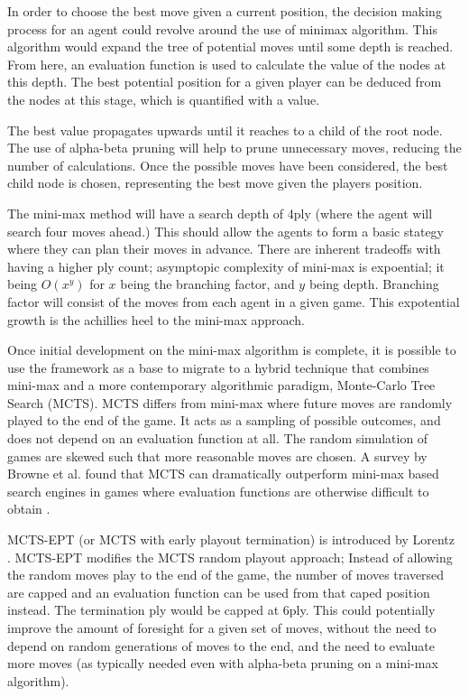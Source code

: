 \documentclass[12pt,a4paper]{article}
\begin{document}
    In order to choose the best move given a current position, the decision making process for an agent could revolve around the use of minimax algorithm. This algorithm would expand the tree of potential moves until some depth is reached. From here, an evaluation function is used to calculate the value of the nodes at this depth. The best potential position for a given player can be deduced from the nodes at this stage, which is quantified with a value.

    The best value propagates upwards until it reaches to a child of the root node. The use of alpha-beta pruning will help to prune unnecessary moves,  reducing the number of calculations. Once the possible moves have been considered, the best child node is chosen, representing the best move given  the players position.

    The mini-max method will have a search depth of 4ply (where the agent will search four moves ahead.) This should allow the agents to form a basic stategy where they can plan their moves in advance. There are inherent tradeoffs with having a higher ply count; asymptopic complexity of mini-max is expoential; it being $O(x^y)$ for $x$ being the branching factor, and $y$ being depth. Branching factor will consist of the moves from each agent in a given game. This expotential growth is the achillies heel to the mini-max approach.

    Once initial development on the mini-max algorithm is complete, it is possible to use the framework as a base to migrate to a hybrid technique that combines mini-max and a more contemporary algorithmic paradigm, Monte-Carlo Tree Search (MCTS). MCTS differs from mini-max where future moves are randomly played to the end of the game. It acts as a sampling of possible outcomes, and does not depend on an evaluation function at all. The random simulation of games are skewed such that more reasonable moves are chosen. A survey by Browne et al. found that MCTS can dramatically outperform mini-max based search engines in games where evaluation functions are otherwise difficult to obtain \cite{browne_survey_2012}.

    MCTS-EPT (or MCTS with early playout termination) is introduced by Lorentz \cite{lorentz_using_2016}. MCTS-EPT modifies the MCTS random playout approach; Instead of allowing the random moves play to the end of the game, the number of moves traversed are capped and an evaluation function can be used from that caped position instead. The termination ply would be capped at 6ply. This could potentially improve the amount of foresight for a given set of moves, without the need to depend on random generations of moves to the end, and the need to evaluate more moves (as typically needed even with alpha-beta pruning on a mini-max algorithm).
    
\end{document}
